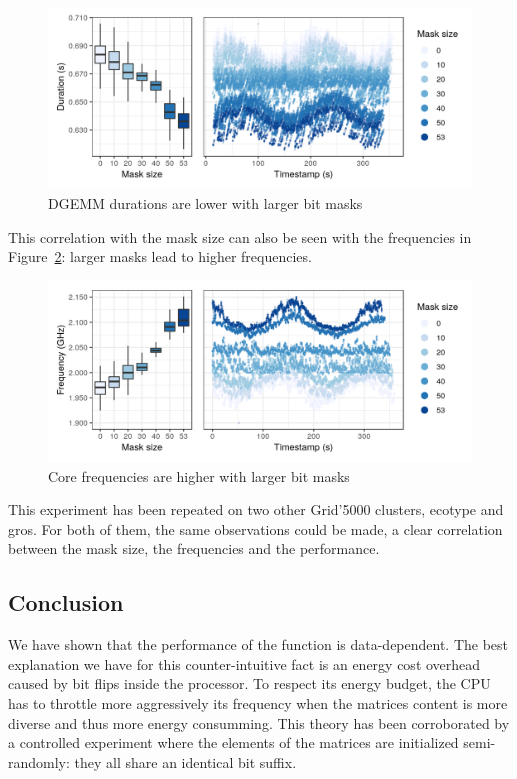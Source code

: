             \begin{figure}[htbp]
                \centering
                \includegraphics[width=\linewidth]{img/experiment/bit-flips/mask_size_perf.png}
                \caption{\label{fig:exp:bit-flips:mask-perf}
                DGEMM durations are lower with larger bit masks}
            \end{figure}

            This correlation with the mask size can also be seen with the frequencies in
            Figure~\ref{fig:exp:bit-flips:mask-freq}: larger masks lead to higher frequencies.

            \begin{figure}[htbp]
                \centering
                \includegraphics[width=\linewidth]{img/experiment/bit-flips/mask_size_freq.png}
                \caption{\label{fig:exp:bit-flips:mask-freq}
                Core frequencies are higher with larger bit masks}
            \end{figure}

            This experiment has been repeated on two other Grid'5000 clusters, ecotype and gros. For both of them, the
            same observations could be made, a clear correlation between the mask size, the frequencies and the
            performance.

        \subsection{Conclusion}
            We have shown that the performance of the \dgemm function is data-dependent. The best explanation we
            have for this counter-intuitive fact is an energy cost overhead caused by bit flips inside the processor.
            To respect its energy budget, the CPU has to throttle more aggressively its frequency when the matrices
            content is more diverse and thus more energy consumming.
            This theory has been corroborated by a controlled experiment where the elements of the matrices are
            initialized semi-randomly: they all share an identical bit suffix.

